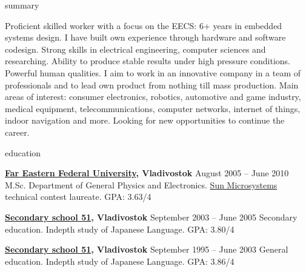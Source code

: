\documentclass{template}
\begin{document}

\begin{rSection}{summary}

Proficient skilled worker with a focus on the EECS: 6+ years in embedded systems design. I have built own experience
through hardware and software codesign. Strong skills in electrical engineering, computer sciences and researching. Ability to
produce stable results under high pressure conditions. Powerful human qualities. I aim to work in an innovative company in a team
of professionals and to lead own product from nothing till mass production. Main areas of interest: consumer electronics, robotics,
automotive and game industry, medical equipment, telecommunications, computer networks, internet of things, indoor navigation and more.
Looking for new opportunities to continue the career.

\end{rSection}


\begin{rSection}{education}

{\bf \href{http://wwwold.dvfu.ru/en/web/fefu/}{Far Eastern Federal University}, Vladivostok} \hfill {August 2005 -- June 2010} \newline
M.Sc. Department of General Physics and Electronics. \newline
\href{http://www.oracle.com}{Sun Microsystems} technical contest laureate. \newline
GPA: 3.63/4

{\bf \href{http://www.school51.pupils.ru}{Secondary school 51}, Vladivostok} \hfill {September 2003 -- June 2005} \newline
Secondary education. \newline
Indepth study of Japanese Language. \newline
GPA: 3.80/4

{\bf \href{http://www.school51.pupils.ru}{Secondary school 51}, Vladivostok} \hfill {September 1995 -- June 2003} \newline
General education. \newline
Indepth study of Japanese Language. \newline
GPA: 3.86/4

\end{rSection}
\end{document}
